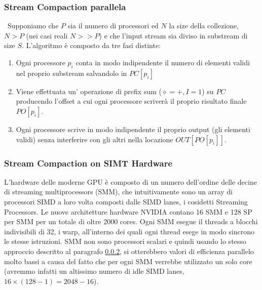 \subsubsection{Stream Compaction parallela}\
Supponiamo che $P$ sia il numero di processori ed $N$ la size della
collezione, $N>P$ (nei casi reali $N>>P$) e che l'input stream
sia diviso in substream di size $S$.
L'algoritmo è composto da tre fasi distinte:
\begin{enumerate}
	\item Ogni processore $p_i$ conta in modo indipendente il numero di
	elementi validi nel proprio substream salvandolo in $PC[p_i]$
	\item Viene effettuata un' operazione di prefix sum ($\diamond = +, I=1$)
	su $PC$ producendo l'offset a cui ogni processore scriverà il proprio
	risultato finale $PO[p_i]$.
	\item Ogni processore scrive in modo indipendente il proprio output (gli
	elementi validi) senza interferire con gli altri nella locazione
	$OUT[PO[p_i]]$.
\end{enumerate}


\subsubsection{Stream Compaction on SIMT Hardware}\label{smparallel}
L'hardware  delle moderne GPU è composto di un numero dell'ordine delle decine
di streaming multiprocessors (SMM), che intuitivamente sono un array di processori SIMD a
loro volta composti dalle SIMD lanes, i cosidetti Streaming Processors. Le
nuove architetture hardware NVIDIA contano 16 SMM e 128 SP per SMM per un
totale di oltre 2000 cores.
Ogni SMM esegue il threads a blocchi indivisibili di 32, i warp, all'interno
dei quali ogni thread esege in modo sincrono le stesse istruzioni. SMM non
sono processori scalari e quindi usando lo stesso approccio descritto al
paragrafo \ref{smparallel}, si otterebbero valori di efficienza parallelo
molto bassi a causa del fatto che per ogni SMM verrebbe utilizzato un solo
core (avremmo infatti un altissimo numero di idle SIMD
lanes,$ 16\times(128-1)=2048-16$).

